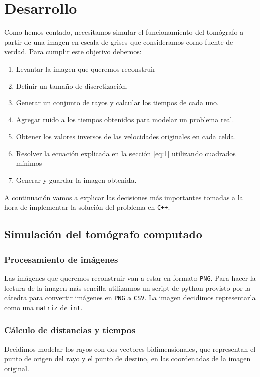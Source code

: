 \section{Desarrollo}
\label{sec:desarrollo}
Como hemos contado, necesitamos simular el funcionamiento del tomógrafo
a partir de una imagen en escala de grises que consideramos como fuente de verdad. Para cumplir este objetivo debemos:

\begin{enumerate}
\item Levantar la imagen que queremos reconstruir
\item Definir un tamaño de discretización.
\item Generar un conjunto de rayos y calcular los tiempos de cada uno.
\item Agregar ruido a los tiempos obtenidos para modelar un problema real.
\item Obtener los valores inversos de las velocidades originales en cada celda.
\item Resolver la ecuación explicada en la sección \ref{eq:1} utilizando cuadrados mínimos %
\item Generar y guardar la imagen obtenida.
\end{enumerate}

A continuación vamos a explicar las decisiones más importantes tomadas a la hora de implementar la solución del problema en \verb|C++|.

\subsection{Simulación del tomógrafo computado}

\subsubsection{Procesamiento de imágenes}
Las imágenes que queremos reconstruir van a estar en formato \verb|PNG|. 
Para hacer la lectura de la imagen más sencilla utilizamos un script de python
 provisto por la cátedra para convertir imágenes en \verb|PNG| a \verb|CSV|. 
La imagen decidimos representarla como una \verb|matriz| de \verb|int|.

\subsubsection{Cálculo de distancias y tiempos}
Decidimos modelar los rayos con dos vectores bidimensionales,
que representan el punto de origen del rayo y el punto de destino,
en las coordenadas de la imagen original.


